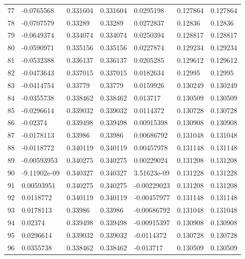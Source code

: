 \begin{longtable}{l|lll|lll}
  77 & -0.0765568   & 0.331604    & 0.331604    &  0.0295198   & 0.127864    & 0.127864    \\
  78 & -0.0707579   & 0.33289     & 0.33289     &  0.0272837   & 0.12836     & 0.12836     \\
  79 & -0.0649374   & 0.334074    & 0.334074    &  0.0250394   & 0.128817    & 0.128817    \\
  80 & -0.0590971   & 0.335156    & 0.335156    &  0.0227874   & 0.129234    & 0.129234    \\
  81 & -0.0532388   & 0.336137    & 0.336137    &  0.0205285   & 0.129612    & 0.129612    \\
  82 & -0.0473643   & 0.337015    & 0.337015    &  0.0182634   & 0.12995     & 0.12995     \\
  83 & -0.0414754   & 0.33779     & 0.33779     &  0.0159926   & 0.130249    & 0.130249    \\
  84 & -0.0355738   & 0.338462    & 0.338462    &  0.013717    & 0.130509    & 0.130509    \\
  85 & -0.0296614   & 0.339032    & 0.339032    &  0.0114372   & 0.130728    & 0.130728    \\
  86 & -0.02374     & 0.339498    & 0.339498    &  0.00915398  & 0.130908    & 0.130908    \\
  87 & -0.0178113   & 0.33986     & 0.33986     &  0.00686792  & 0.131048    & 0.131048    \\
  88 & -0.0118772   & 0.340119    & 0.340119    &  0.00457978  & 0.131148    & 0.131148    \\
  89 & -0.00593953  & 0.340275    & 0.340275    &  0.00229024  & 0.131208    & 0.131208    \\
  90 & -9.11902e-09 & 0.340327    & 0.340327    &  3.51623e-09 & 0.131228    & 0.131228    \\
  91 &  0.00593951  & 0.340275    & 0.340275    & -0.00229023  & 0.131208    & 0.131208    \\
  92 &  0.0118772   & 0.340119    & 0.340119    & -0.00457977  & 0.131148    & 0.131148    \\
  93 &  0.0178113   & 0.33986     & 0.33986     & -0.00686792  & 0.131048    & 0.131048    \\
  94 &  0.02374     & 0.339498    & 0.339498    & -0.00915397  & 0.130908    & 0.130908    \\
  95 &  0.0296614   & 0.339032    & 0.339032    & -0.0114372   & 0.130728    & 0.130728    \\
  96 &  0.0355738   & 0.338462    & 0.338462    & -0.013717    & 0.130509    & 0.130509    \\

\end{longtable}
